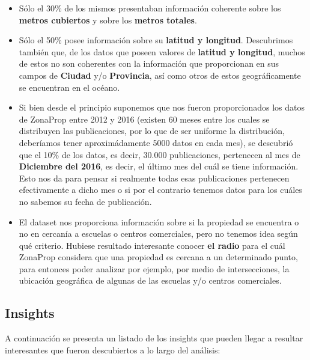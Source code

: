 \documentclass[
10pt, %
a4paper, %
oneside, %
headinclude,footinclude, %
BCOR5mm, %
]{scrartcl}
\begin{document}
    \begin{itemize}
        \item S\'olo el 30\% de los mismos presentaban informaci\'on coherente sobre los \textbf{metros cubiertos} y sobre los \textbf{metros totales}. 
        \item S\'olo el 50\% posee informaci\'on sobre su \textbf{latitud y longitud}. Descubrimos tambi\'en que, de los datos que poseen valores de \textbf{latitud y longitud}, muchos de estos no son coherentes con la informaci\'on que proporcionan en sus campos de \textbf{Ciudad} y/o \textbf{Provincia}, as\'i como otros de estos geogr\'aficamente se encuentran en el océano.
        \item Si bien desde el principio suponemos que nos fueron proporcionados los datos de ZonaProp entre 2012 y 2016 (existen 60 meses entre los cuales se distribuyen las publicaciones, por lo que de ser uniforme la distribuci\'on, deber\'iamos tener aproxim\'adamente 5000 datos en cada mes), se descubri\'o que el 10\% de los datos, es decir, 30.000 publicaciones, pertenecen al mes de \textbf{Diciembre del 2016}, es decir, el \'ultimo mes del cu\'al se tiene informaci\'on. Esto nos da para pensar si realmente todas esas publicaciones pertenecen efectivamente a dicho mes o si por el contrario tenemos datos para los cu\'ales no sabemos su fecha de publicaci\'on. 
        \item El dataset nos proporciona informaci\'on sobre si la propiedad se encuentra o no en cercan\'ia a escuelas o centros comerciales, pero no tenemos idea seg\'un qu\'e criterio. Hubiese resultado interesante conocer \textbf{el radio} para el cu\'al ZonaProp considera que una propiedad es cercana a un determinado punto, para entonces poder analizar por ejemplo, por medio de intersecciones, la ubicaci\'on geogr\'afica de algunas de las escuelas y/o centros comerciales.
        
    \end{itemize}
    
\subsection{Insights}

    A continuaci\'on se presenta un listado de los insights que pueden llegar a resultar interesantes que fueron descubiertos a lo largo del an\'alisis:
    
\end{document}
